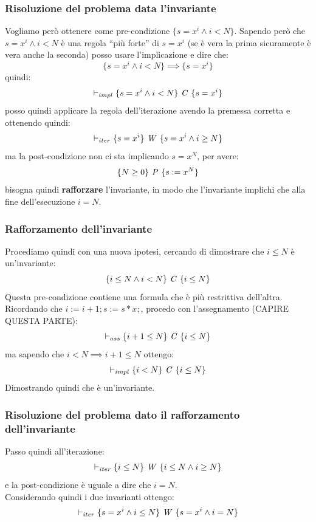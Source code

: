 \begin{esempio}
				      			\subsubsection{Risoluzione del problema data l'invariante}
				      			Vogliamo però ottenere come pre-condizione $\{s=x^i\land i<N\}$. Sapendo però
				      			che $s= x^i\land i<N$ è una regola ``più forte'' di $s= x^i$ (se è vera la
				      			prima sicuramente è vera anche la seconda) posso usare
				      			l'implicazione e dire che:
				      			\[\{s=x^i\land i<N\}\implies \{s= x^i\}\] 
				      			quindi:
				      			\[\vdash_{impl} \{s=x^i\land i<N\}\mbox{ \textit{C} }\{s=x^i\}\]
				      			posso quindi applicare la regola dell'iterazione avendo la premessa corretta e
				      			ottenendo quindi:
				      			\[\vdash_{iter}\{s=x^i\}\mbox{ \textit{W} }\{s=x^i\land i\geq N\}\]
				      			ma la post-condizione non ci sta implicando $s=x^N$, per avere:
				      			\[\{N\geq 0\}\mbox{ \textit{P} }\{s\cceq x^N\}\]
				      			bisogna quindi \textbf{rafforzare} l'invariante, in modo che l'invariante
				      			implichi che alla fine dell'esecuzione $i=N$.\\
				      			\subsubsection{Rafforzamento dell'invariante}
				      			Procediamo quindi con una nuova ipotesi, cercando di dimostrare che $i\leq N$
				      			è un'invariante:
				      			\[\{i\leq N\land i<N\}\mbox{ \textit{C} }\{i\leq N\}\]
				      			Questa pre-condizione contiene una formula che è più restrittiva dell'altra.
				      			Ricordando che $i := i + 1; s := s * x;$, procedo con l'assegnamento (CAPIRE QUESTA PARTE):
				      			\[\vdash_{ass}\{i+1\leq N\}\mbox{ \textit{C} }\{i\leq N\}\]
				      			ma sapendo che $i<N\implies i+1\leq N$ ottengo:
				      			\[\vdash_{impl}\{i< N\}\mbox{ \textit{C} }\{i\leq N\}\]
				      			Dimostrando quindi che è un'invariante.\\
				      			\subsubsection{Risoluzione del problema dato il rafforzamento dell'invariante}
				      			Passo quindi all'iterazione:
				      			\[\vdash_{iter}\{i\leq N\}\mbox{ \textit{W} }\{i\leq N\land i\geq N\}\]
				      			e la post-condizione è uguale a dire che $i=N$.\\
				      			Considerando quindi i due invarianti ottengo:
				      			\[\vdash_{iter}\{s=x^i\land i\leq N\}\mbox{ \textit{W} }
				      				\{s=x^i\land i= N\}\]

\end{esempio}
